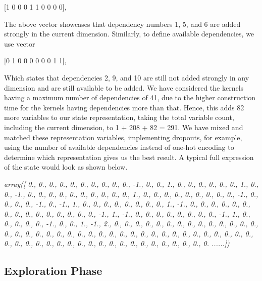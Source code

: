 \documentclass[logo,msc]{infthesis}           %
\begin{document}
\begin{center}
[1 0 0 0 1 1 0 0 0 0],
\end{center}

The above vector showcases that dependency numbers 1, 5, and 6 are added strongly in the current dimension. Similarly, to define available dependencies, we use vector
\begin{center}
[0 1 0 0 0 0 0 0 1 1],
\end{center}

Which states that dependencies 2, 9, and 10 are still not added strongly in any dimension and are still available to be added. We have considered the kernels having a maximum number of dependencies of 41, due to the higher construction time for the kernels having dependencies more than that. Hence, this adds 82 more variables to our state representation, taking the total variable count, including the current dimension, to 1 + 208 + 82 = 291. We have mixed and matched these representation variables, implementing dropouts, for example, using the number of available dependencies instead of one-hot encoding to determine which representation gives us the best result. A typical full expression of the state would look as shown below.

\textit{array([ 0.,  0.,  0.,  0.,  0.,  0.,  0.,  0.,  0.,  0., -1.,  0.,  0.,
        1.,  0.,  0.,  0.,  0.,  0.,  0.,  1.,  0.,  0., -1.,  0.,  0.,
        0.,  0.,  0.,  0.,  0.,  0.,  0.,  0.,  1.,  0.,  0.,  0.,  0.,
        0.,  0.,  0.,  0.,  0., -1.,  0.,  0.,  0.,  0., -1.,  0., -1.,
        1.,  0.,  0.,  0.,  0.,  0.,  0.,  0.,  0.,  1., -1.,  0.,  0.,
        0.,  0.,  0.,  0.,  0.,  0.,  0.,  0.,  0.,  0.,  0.,  0.,  0.,
       -1.,  1., -1.,  0.,  0.,  0.,  0.,  0.,  0.,  0.,  0., -1.,  1.,
        0.,  0.,  0.,  0.,  0., -1.,  0.,  0.,  1., -1.,  2.,  0.,  0.,
        0.,  0.,  0.,  0.,  0.,  0.,  0.,  0.,  0.,  0.,  0.,  0.,  0.,
        0.,  0.,  0.,  0.,  0.,  0.,  0.,  0.,  0.,  0.,  0.,  0.,  0.,
        0.,  0.,  0.,  0.,  0.,  0.,  0.,  0.,  0.,  0.,  0.,  0.,  0.,
        0.,  0.,  0.,  0.,  0.,  0.,  0.,  0.,  0.,  0.,  0.,  0.,  0.,
        0.,  0.,  0.,  0. ......])}

\subsection{Exploration Phase}
\end{document}
